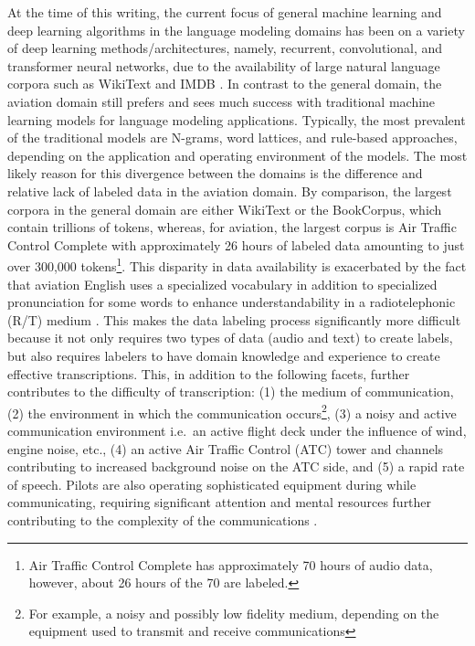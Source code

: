 \documentclass[12pt]{article}
\begin{document}
At the time of this writing, the current focus of general machine learning and deep learning algorithms in the language modeling domains has been on a
variety of deep learning methods/architectures, namely, recurrent, convolutional, and transformer neural networks, due to the availability of large
natural language corpora such as WikiText \cite{merity_pointer_2016} and IMDB \cite{maas_learning_2011}. In contrast to the general domain, the
aviation domain still prefers and sees much success with traditional machine learning models for language modeling applications. Typically, the most
prevalent of the traditional models are N-grams, word lattices, and rule-based approaches, depending on the application and operating environment of
the models. The most likely reason for this divergence between the domains is the difference and relative lack of labeled data in the aviation domain.
By comparison, the largest corpora in the general domain are either WikiText or the BookCorpus, which contain trillions of tokens, whereas, for
aviation, the largest corpus is Air Traffic Control Complete with approximately 26 hours of labeled data amounting to just over 300,000
tokens\footnote{Air Traffic Control Complete has approximately 70 hours of audio data, however, about 26 hours of the 70 are labeled.}. This disparity
in data availability is exacerbated by the fact that aviation English uses a specialized vocabulary in addition to specialized pronunciation for some
words to enhance understandability in a radiotelephonic (R/T) medium \cite{paltridge_handbook_2013}. This makes the data labeling process
significantly more difficult because it not only requires two types of data (audio and text) to create labels, but also requires labelers to have
domain knowledge and experience to create effective transcriptions. This, in addition to the following facets, further contributes to the difficulty
of transcription: (1) the medium of communication, (2) the environment in which the communication occurs\footnote{For example, a noisy and possibly
    low fidelity medium, depending on the equipment used to transmit and receive communications}, (3) a noisy and active communication environment
i.e.~an active flight deck under the influence of wind, engine noise, etc., (4) an active Air Traffic Control (ATC) tower and channels contributing to
increased background noise on the ATC side, and (5) a rapid rate of speech. Pilots are also operating sophisticated equipment during while
communicating, requiring significant attention and mental resources further contributing to the complexity of the communications
\cite{paltridge_handbook_2013}.
\end{document}
